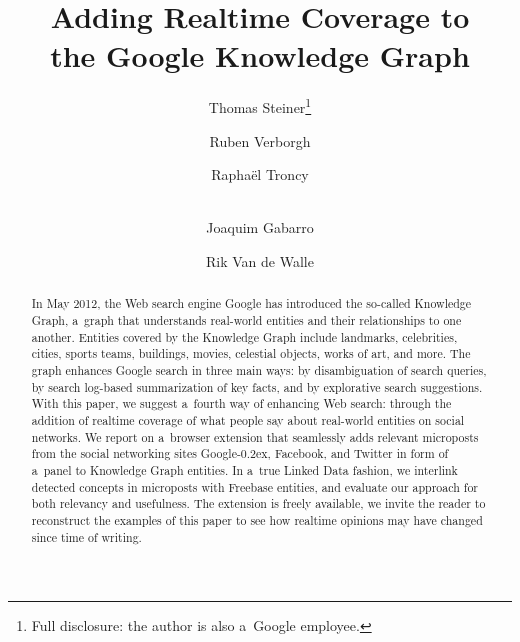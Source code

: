 \documentclass[runningheads,a4paper]{llncs}
\newcommand{\googleplus}{Google\nolinebreak\hspace{0em}\raisebox{.28ex}{\tiny\bf +}\kern-0.2ex\xspace}
\begin{document}
\title{Adding Realtime Coverage to\\the Google Knowledge Graph}

\author{Thomas Steiner\thanks{Full disclosure: the author is also a~Google employee.} \and
		Ruben Verborgh \and 
		Raphaël Troncy \and \\
		Joaquim Gabarro \and 
		Rik Van de Walle		
}


\maketitle
\setcounter{footnote}{0}

\begin{abstract}
In May 2012, the Web search engine Google has introduced the so-called Knowledge Graph,
a~graph that understands real-world entities and their relationships to one another.
Entities covered by the Knowledge Graph include landmarks, celebrities, cities, sports
teams, buildings, movies, celestial objects, works of art, and more.
The graph enhances Google search in three main ways:
by disambiguation of search queries,
by search log-based summarization of key facts,
and by explorative search suggestions.
With this paper, we suggest a~fourth way of enhancing Web search:
through the addition of realtime coverage
of what people say about real-world entities on social networks.
We report on a~browser extension that seamlessly adds relevant microposts
from the social networking sites \googleplus, Facebook, and Twitter
in form of a~panel to Knowledge Graph entities.
In a~true Linked Data fashion, we interlink detected concepts in microposts
with Freebase entities, and evaluate our approach for both relevancy and usefulness.
The extension is freely available,
we invite the reader to reconstruct the examples of this paper
to see how realtime opinions may have changed since time of writing.
\end{abstract}
\end{document}
